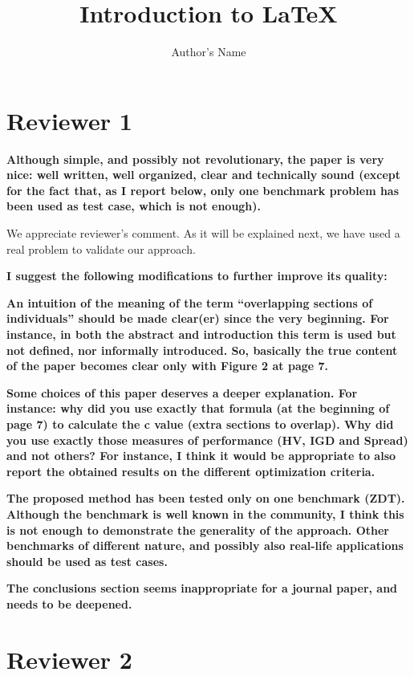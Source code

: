 \documentclass{article}
\begin{document}
\title{Introduction to \LaTeX{}}
\author{Author's Name}

\maketitle

\section{Reviewer 1}



\textbf{Although simple, and possibly not revolutionary, the paper is very nice: well written, well organized, clear and technically sound (except for the fact that, as I report below, only one benchmark problem has been used as test case, which is not enough).}

We appreciate reviewer's comment. As it will be explained next, we have used a real problem to validate our approach.

\textbf{I suggest the following modifications to further improve its quality:}

\textbf{An intuition of the meaning of the term ``overlapping sections of individuals'' should be made clear(er) since the very beginning. For instance, in both the abstract and introduction this term is used but not defined, nor informally introduced. So, basically the true content of the paper becomes clear only with Figure 2 at page 7.}

\textbf{Some choices of this paper deserves a deeper explanation. For instance: why did you use exactly that formula (at the beginning of page 7) to calculate the c value (extra sections to overlap). Why did you use exactly those measures of performance (HV, IGD and Spread) and not others? For instance, I think it would be appropriate to also report the obtained results on the different optimization criteria.}

\textbf{The proposed method has been tested only on one benchmark (ZDT). Although the benchmark is well known in the community, I think this is not enough to demonstrate the generality of the approach. Other benchmarks of different nature, and possibly also real-life applications should be used as test cases.}

\textbf{The conclusions section seems inappropriate for a journal paper, and needs to be deepened.}

\section{Reviewer 2}
\end{document}
